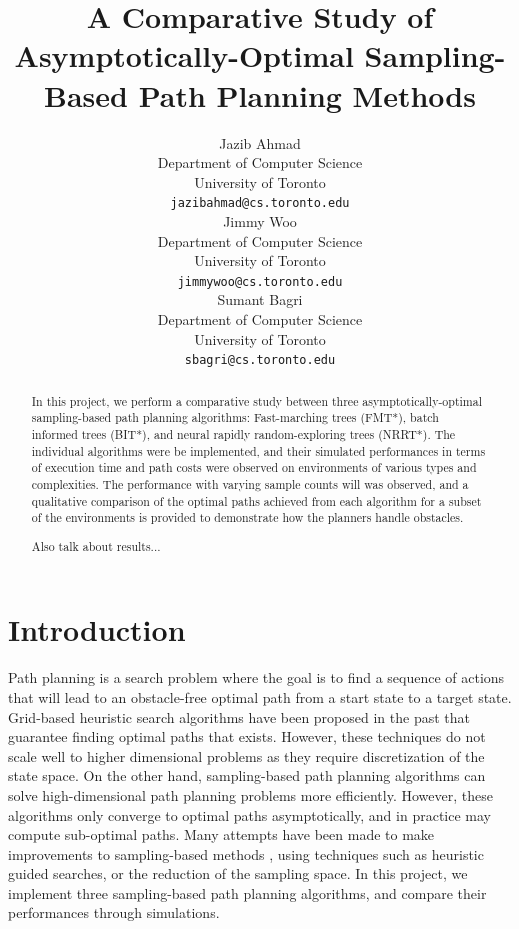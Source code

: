 \documentclass{article}
\title{A Comparative Study of Asymptotically-Optimal Sampling-Based Path Planning Methods}
\author{
  Jazib Ahmad \\
  Department of Computer Science \\
  University of Toronto \\
  \texttt{jazibahmad@cs.toronto.edu} \\
  \And
  Jimmy Woo \\
  Department of Computer Science \\
  University of Toronto \\
  \texttt{jimmywoo@cs.toronto.edu} \\
  \And
  Sumant Bagri \\
  Department of Computer Science \\
  University of Toronto \\
  \texttt{sbagri@cs.toronto.edu} \\
}
\begin{document}
\maketitle


\begin{abstract}
In this project, we perform a comparative study between three asymptotically-optimal sampling-based path planning algorithms: Fast-marching trees (FMT*), batch informed trees (BIT*), and neural rapidly random-exploring trees (NRRT*). The individual algorithms were be implemented, and their simulated performances in terms of execution time and path costs were observed on environments of various types and complexities. The performance with varying sample counts will was observed, and a qualitative comparison of the optimal paths achieved from each algorithm for a subset of the environments is provided to demonstrate how the planners handle obstacles.

Also talk about results...
\end{abstract}



\section{Introduction}
Path planning is a search problem where the goal is to find a sequence of actions that will lead to an obstacle-free optimal path from a start state to a target state. Grid-based heuristic search algorithms \cite{astar} have been proposed in the past that guarantee finding optimal paths that exists. However, these techniques do not scale well to higher dimensional problems as they require discretization of the state space. On the other hand, sampling-based path planning algorithms \cite{rrt*} can solve high-dimensional path planning problems more efficiently. However, these algorithms only converge to optimal paths asymptotically, and in practice may compute sub-optimal paths. Many attempts have been made to make improvements to sampling-based methods \cite{irrt}\cite{SBA*}\cite{RA*}, using techniques such as heuristic guided searches, or the reduction of the sampling space. In this project, we implement three sampling-based path planning algorithms, and compare their performances through simulations.
\end{document}
